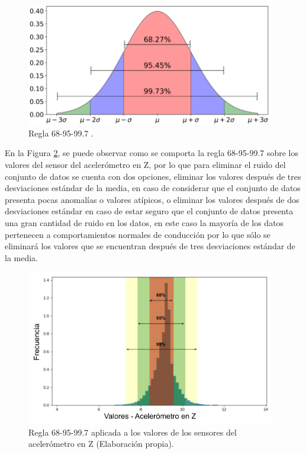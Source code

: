 \begin{figure}[h!]
  \begin{center}	\includegraphics[width=0.97\textwidth,frame]{imagenes/Cap3/68-95-99_rule}
  \caption{Regla 68-95-99.7 \protect\cite{Reference74}.}
  \label{fig:689599rule}
  \end{center}
\end{figure}

En la Figura \ref{fig:689599rule_acc_z}, se puede observar como se comporta la regla 68-95-99.7 sobre los valores del sensor del aceler\'{o}metro en Z, por lo que para eliminar el ruido del conjunto de datos se cuenta con dos opciones, eliminar los valores despu\'{e}s de tres desviaciones est\'{a}ndar de la media, en caso de considerar que el conjunto de datos presenta pocas anomal\'{i}as o valores at\'{i}picos, o eliminar los valores despu\'{e}s de dos desviaciones est\'{a}ndar en caso de estar seguro que el conjunto de datos presenta una gran cantidad de ruido en los datos, en este caso la mayor\'{i}a de los datos pertenecen a comportamientos normales de conducci\'{o}n por lo que s\'{o}lo se eliminar\'{a} los valores que se encuentran despu\'{e}s de tres desviaciones est\'{a}ndar de la media.


\begin{figure}[h!]
  \begin{center}	\includegraphics[width=0.97\textwidth,frame]{imagenes/Cap3/68-95-99_rule_acc_z}
  \caption{Regla 68-95-99.7 aplicada a los valores de los sensores del aceler\'{o}metro en Z (Elaboraci\'{o}n propia). }
  \label{fig:689599rule_acc_z}
  \end{center}
\end{figure}

